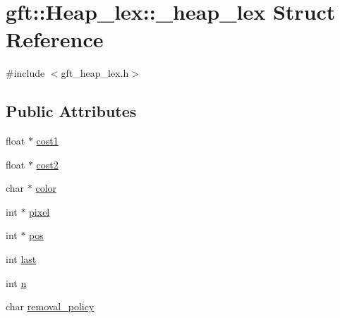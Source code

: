 \hypertarget{structgft_1_1Heap__lex_1_1__heap__lex}{\section{gft\-:\-:Heap\-\_\-lex\-:\-:\-\_\-heap\-\_\-lex Struct Reference}
\label{structgft_1_1Heap__lex_1_1__heap__lex}
}


{\ttfamily \#include $<$gft\-\_\-heap\-\_\-lex.\-h$>$}

\subsection*{Public Attributes}
\begin{DoxyCompactItemize}
\item 
float $\ast$ \hyperlink{structgft_1_1Heap__lex_1_1__heap__lex_adb994da50748c66c60baaeb1cc7e9621}{cost1}
\item 
float $\ast$ \hyperlink{structgft_1_1Heap__lex_1_1__heap__lex_a3466f5f8156f9a78243e1cb0681e4543}{cost2}
\item 
char $\ast$ \hyperlink{structgft_1_1Heap__lex_1_1__heap__lex_a2d27af429b7cb96b06c3804f30213571}{color}
\item 
int $\ast$ \hyperlink{structgft_1_1Heap__lex_1_1__heap__lex_ad0959c04c1544378684b566f6d2cbe8c}{pixel}
\item 
int $\ast$ \hyperlink{structgft_1_1Heap__lex_1_1__heap__lex_a5930686532a650d25969bba672e88d35}{pos}
\item 
int \hyperlink{structgft_1_1Heap__lex_1_1__heap__lex_a1fa6dd90ba48e743b9c1f8550503fc53}{last}
\item 
int \hyperlink{structgft_1_1Heap__lex_1_1__heap__lex_a1401a3c1ed4b831f50b513034b7e881a}{n}
\item 
char \hyperlink{structgft_1_1Heap__lex_1_1__heap__lex_ae260010a97dcb6824b62a594d3477709}{removal\-\_\-policy}
\end{DoxyCompactItemize}


